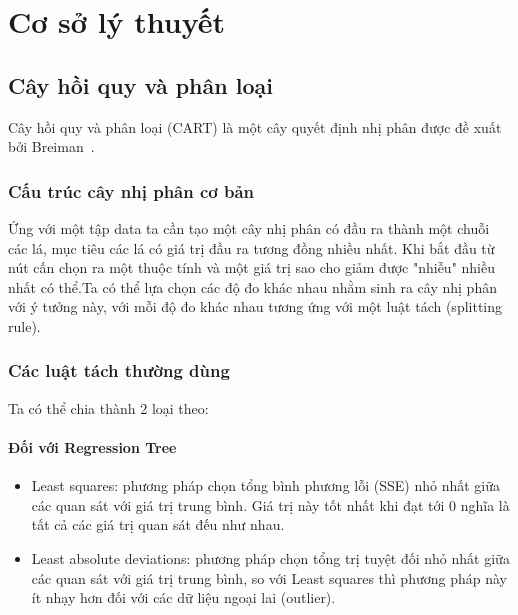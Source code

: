 \chapter{Cơ sở lý thuyết} 
\section{Cây hồi quy và phân loại}
Cây hồi quy và phân loại (CART) là một cây quyết định nhị phân được đề xuất bởi Breiman~\cite{23}.\\

\subsection{Cấu trúc cây nhị phân cơ bản}
 Ứng  với một tập data ta cần tạo một  cây nhị phân có đầu ra thành một chuỗi các lá, mục tiêu các lá có giá trị đầu ra tương đồng nhiều nhất. Khi bắt đầu từ nút cấn chọn ra một thuộc tính và một giá trị sao cho giảm được "nhiễu" nhiều nhất có thể.Ta có thể lựa chọn các độ đo khác nhau nhằm sinh ra cây nhị phân với ý tưởng này, với mỗi độ đo khác nhau tương ứng với một luật tách (splitting rule).\\
\subsection{Các luật tách thường dùng} Ta có thể chia thành 2 loại theo:
\subsubsection{Đối với Regression Tree}
\begin{itemize}
\item Least squares: phương pháp chọn tổng bình phương lỗi (SSE) nhỏ nhất giữa các quan sát với giá trị trung bình. Giá trị này tốt nhất khi đạt tới 0 nghĩa là tất cả các giá trị quan sát đếu như nhau.
\item Least absolute deviations: phương pháp chọn tổng  trị tuyệt đối nhỏ nhất giữa các quan sát với giá trị trung bình, so với Least squares thì phương pháp này ít nhạy hơn đối với các dữ liệu ngoại lai (outlier). 
\end{itemize}
